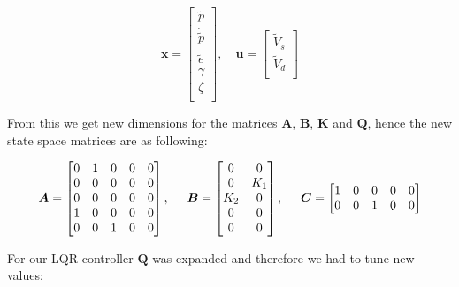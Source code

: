 \begin{equation}
  \label{eq:state_space_vectors}
  \bm{x} =
  \begin{bmatrix}
    \tilde{p} \\
    \dot{\tilde{p}} \\
    \dot{\tilde{e}} \\
    \gamma \\
    \zeta \\
  \end{bmatrix} ,
  \quad \bm{u} =
  \begin{bmatrix}
    \tilde{V}_s \\
    \tilde{V}_d \\
  \end{bmatrix}
\end{equation}

\newline

From this we get new dimensions for the matrices $\bm{A}$, $\bm{B}$, $\bm{K}$ and $\bm{Q}$, hence the new state space matrices are as following:

\begin{equation}
  \boldsymbol{A} = \begin{bmatrix}
    0 & 1 & 0 & 0 & 0\\
    0 & 0 & 0 & 0 & 0\\
    0 & 0 & 0 & 0 & 0\\
    1 & 0 & 0 & 0 & 0\\
    0 & 0 & 1 & 0 & 0\\
  \end{bmatrix}, \hspace{0.5cm}
  \boldsymbol{B} = \begin{bmatrix}
    0 & 0 \\
    0 & K_1 \\
    K_2 & 0 \\
    0 & 0 \\
    0 & 0 \\
  \end{bmatrix}, \hspace{0.5cm}
  \boldsymbol{C} = \begin{bmatrix}
    1 & 0 & 0 & 0 & 0\\
    0 & 0 & 1 & 0 & 0\\
  \end{bmatrix}
\end{equation}

\newline

For our LQR controller $\bm{Q}$ was expanded and therefore we had to tune new values: 

